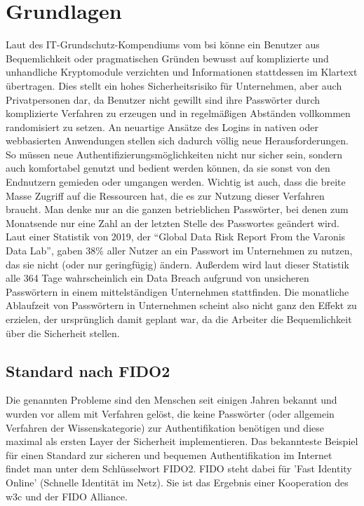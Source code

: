 \chapter{Grundlagen}
Laut des IT-Grundschutz-Kompendiums vom \ac{bsi} könne ein Benutzer aus Bequemlichkeit oder pragmatischen Gründen bewusst auf komplizierte und unhandliche Kryptomodule verzichten und Informationen stattdessen im Klartext übertragen. \cite{A5} Dies stellt ein hohes Sicherheitsrisiko für Unternehmen, aber auch Privatpersonen dar, da Benutzer nicht gewillt sind ihre Passwörter durch komplizierte Verfahren zu erzeugen und in regelmäßigen Abständen vollkommen randomisiert zu setzen. An neuartige Ansätze des Logins in nativen oder webbasierten Anwendungen stellen sich dadurch völlig neue Herausforderungen. So müssen neue Authentifizierungsmöglichkeiten nicht nur sicher sein, sondern auch komfortabel genutzt und bedient werden können, da sie sonst von den Endnutzern gemieden oder umgangen werden. Wichtig ist auch, dass die breite Masse Zugriff auf die Ressourcen hat, die es zur Nutzung dieser Verfahren braucht. Man denke nur an die ganzen betrieblichen Passwörter, bei denen zum Monatsende nur eine Zahl an der letzten Stelle des Passwortes geändert wird. Laut einer Statistik von 2019, der ``Global Data Risk Report From the Varonis Data Lab'', gaben 38\% aller Nutzer an ein Passwort im Unternehmen zu nutzen, das sie nicht (oder nur geringfügig) ändern. Außerdem wird laut dieser Statistik alle 364 Tage wahrscheinlich ein Data Breach aufgrund von unsicheren Passwörtern in einem mittelständigen Unternehmen stattfinden. Die monatliche Ablaufzeit von Passwörtern in Unternehmen scheint also nicht ganz den Effekt zu erzielen, der ursprünglich damit geplant war, da die Arbeiter die Bequemlichkeit über die Sicherheit stellen.

\section{Standard nach FIDO2}
Die genannten Probleme sind den Menschen seit einigen Jahren bekannt und wurden vor allem mit Verfahren gelöst, die keine Passwörter (oder allgemein Verfahren der Wissenskategorie) zur Authentifikation benötigen und diese maximal als ersten Layer der Sicherheit implementieren. Das bekannteste Beispiel für einen Standard zur sicheren und bequemen Authentifikation im Internet findet man unter dem Schlüsselwort FIDO2. FIDO steht dabei für 'Fast Identity Online' (Schnelle Identität im Netz). Sie ist das Ergebnis einer Kooperation des \ac{w3c} und der FIDO Alliance.

